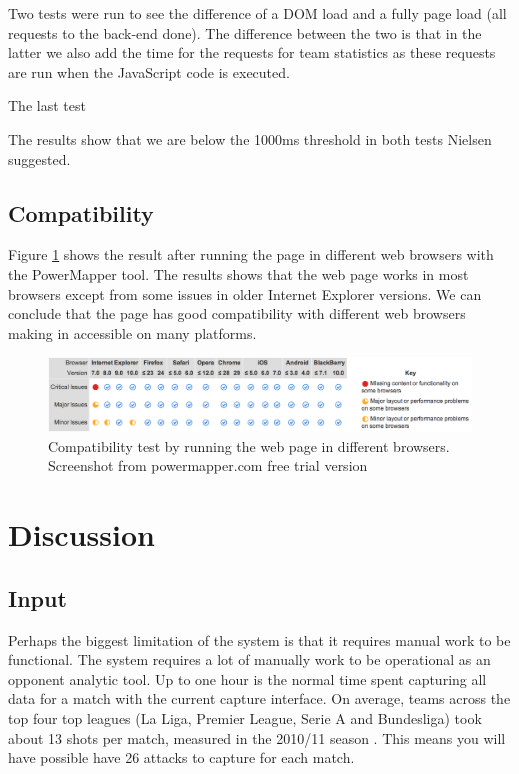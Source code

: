Two tests were run to see the difference of a DOM load and a fully page load (all requests to the back-end done). The difference between the two is that in the latter we also add the time for the requests for team statistics as these requests are run when the JavaScript code is executed. 

The last test 

The results show that we are below the 1000ms threshold in both tests Nielsen \cite{nielsen} suggested. 

\subsection{Compatibility}

Figure \ref{fig:compa} shows the result after running the page in different web browsers with the PowerMapper tool. The results shows that the web page works in most browsers except from some issues in older Internet Explorer versions. We can conclude that the page has good compatibility with different web browsers making in accessible on many platforms.

\begin{figure}[ht!]
\centering
\includegraphics[width=1\textwidth]{images/evaluation/compa}
\caption{Compatibility test by running the web page in different browsers. Screenshot from powermapper.com free trial version}
\label{fig:compa}
\end{figure}

\section{Discussion}
\subsection{Input}

Perhaps the biggest limitation of the system is that it requires manual work to be functional. The system requires a lot of manually work to be operational as an opponent analytic tool. Up to one hour is the normal time spent capturing all data for a match with the current capture interface. On average, teams across the top four top leagues (La Liga, Premier League, Serie A and Bundesliga) took about 13 shots per match, measured in the 2010/11 season \cite{soccerbynumbers}. This means you will have possible have 26 attacks to capture for each match. 

